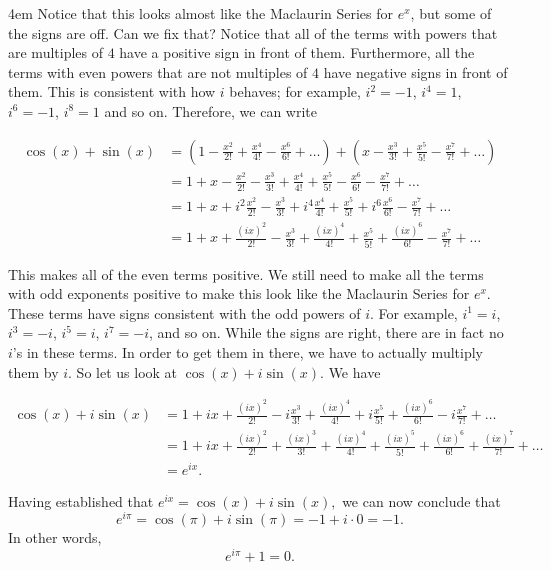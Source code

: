 \documentclass[12pt]{article}
\begin{document}
\begin{addmargin}[3em]{4em}
\noindent Notice that this looks almost like the Maclaurin Series for $e^x$, but some of the signs are off. Can we fix that? Notice that all of the terms with powers that are multiples of $4$ have a positive sign in front of them. Furthermore, all the terms with even powers that are not multiples of $4$ have negative signs in front of them. This is consistent with how $i$ behaves; for example, $i^2 = -1$, $i^4=1$, $i^6=-1$, $i^8=1$ and so on. Therefore, we can write

\begin{align*}
\cos(x) + \sin(x) &= \left(1 - \frac{x^2}{2!} + \frac{x^4}{4!} - \frac{x^6}{6!} + \ldots\right) + \left( x - \frac{x^3}{3!} + \frac{x^5}{5!} - \frac{x^7}{7!} + \ldots\right) \\
&= 1 + x - \frac{x^2}{2!} - \frac{x^3}{3!} + \frac{x^4}{4!} + \frac{x^5}{5!} - \frac{x^6}{6!} - \frac{x^7}{7!} + \ldots \\
&= 1 + x + i^2 \frac{x^2}{2!} - \frac{x^3}{3!} + i^4 \frac{x^4}{4!} + \frac{x^5}{5!} + i^6 \frac{x^6}{6!} - \frac{x^7}{7!} + \ldots \\ 
&= 1 + x + \frac{(ix)^2}{2!} - \frac{x^3}{3!} + \frac{(ix)^4}{4!} + \frac{x^5}{5!} + \frac{(ix)^6}{6!} - \frac{x^7}{7!} + \ldots
\end{align*}

\noindent This makes all of the even terms positive. We still need to make all the terms with odd exponents positive to make this look like the Maclaurin Series for $e^x$. These terms have signs consistent with the odd powers of $i$. For example, $i^1=i$, $i^3=-i$, $i^5=i$, $i^7=-i$, and so on. While the signs are right, there are in fact no $i$'s in these terms. In order to get them in there, we have to actually multiply them by $i$. So let us look at $\cos(x) + i\sin(x).$ We have 

\begin{align*}
\cos(x) + i\sin(x) &= 1 + ix + \frac{(ix)^2}{2!} - i\frac{x^3}{3!} + \frac{(ix)^4}{4!} + i\frac{x^5}{5!} + \frac{(ix)^6}{6!} - i\frac{x^7}{7!} + \ldots \\
&= 1 + ix + \frac{(ix)^2}{2!} + \frac{(ix)^3}{3!} + \frac{(ix)^4}{4!} + \frac{(ix)^5}{5!} + \frac{(ix)^6}{6!} + \frac{(ix)^7}{7!} + \ldots \\
&= e^{ix}.
\end{align*}

\noindent Having established that $e^{ix} = \cos(x) + i\sin(x),$ we can now conclude that $$e^{i\pi} = \cos(\pi) + i \sin(\pi) = -1 + i \cdot 0 = -1.$$ In other words, $$e^{i\pi} + 1 = 0.$$

\end{addmargin}
\end{document}
